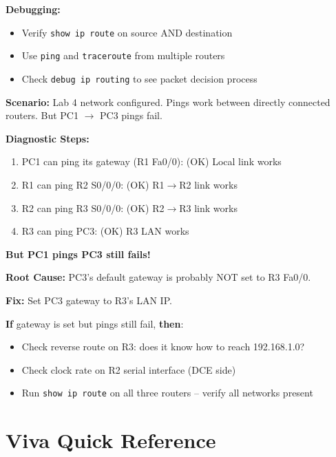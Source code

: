 \documentclass[12pt,a4paper]{article}
\begin{document}
\begin{abox}
\textbf{Debugging:}
\begin{itemize}
    \item Verify \texttt{show ip route} on source AND destination
    \item Use \texttt{ping} and \texttt{traceroute} from multiple routers
    \item Check \texttt{debug ip routing} to see packet decision process
\end{itemize}
\end{abox}


\begin{condbox}
\textbf{Scenario:} Lab 4 network configured. Pings work between directly connected routers. But PC1 $\rightarrow$ PC3 pings fail.

\textbf{Diagnostic Steps:}
\begin{enumerate}
    \item PC1 can ping its gateway (R1 Fa0/0): (OK) Local link works
    \item R1 can ping R2 S0/0/0: (OK) R1$\rightarrow$R2 link works
    \item R2 can ping R3 S0/0/0: (OK) R2$\rightarrow$R3 link works
    \item R3 can ping PC3: (OK) R3 LAN works
\end{enumerate}

\textbf{But PC1 pings PC3 still fails!}

\textbf{Root Cause:} PC3's default gateway is probably NOT set to R3 Fa0/0.

\textbf{Fix:} Set PC3 gateway to R3's LAN IP.

\textbf{If} gateway is set but pings still fail, \textbf{then}:
\begin{itemize}
    \item Check reverse route on R3: does it know how to reach 192.168.1.0?
    \item Check clock rate on R2 serial interface (DCE side)
    \item Run \texttt{show ip route} on all three routers -- verify all networks present
\end{itemize}
\end{condbox}

\section{Viva Quick Reference}
\end{document}
